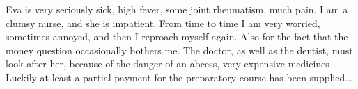 
Eva is very seriously sick, high fever, some joint rheumatism, much pain. I am a clumsy nurse, and she is impatient. From time to time I am very worried, sometimes annoyed, and then I reproach myself again. Also for the fact that the money question occasionally bothers me. The doctor, as well as the dentist, must look after her, because of the danger of an abcess, very expensive medicines . Luckily at least a partial payment for the preparatory course has been supplied...
\missing

